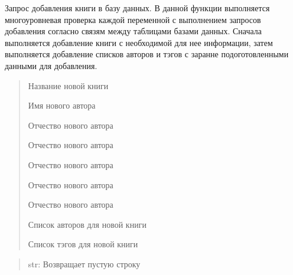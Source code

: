 \documentclass[letterpaper,10pt,russian]{sphinxmanual}
\begin{document}

\begin{fulllineitems}
\label{\detokenize{blueprints:blueprints.add_to_database.add_file}}
\pysigstartsignatures
{}
\pysigstopsignatures
\sphinxAtStartPar
Запрос добавления книги в базу данных.
В данной функции выполняется многоуровневая проверка каждой переменной с выполнением
запросов добавления согласно связям между таблицами базами данных.
Сначала выполняется добавление книги с необходимой для нее информации,
затем выполняется добавление списков авторов и тэгов с заранне подоготовленными данными
для добавления.
\begin{description}
\begin{quote}\begin{description}
\sphinxAtStartPar
Название новой книги

\sphinxAtStartPar
Имя нового автора

\sphinxAtStartPar
Отчество нового автора

\sphinxAtStartPar
Отчество нового автора

\sphinxAtStartPar
Отчество нового автора

\sphinxAtStartPar
Отчество нового автора

\sphinxAtStartPar
Отчество нового автора

\sphinxAtStartPar
Список авторов для новой книги

\sphinxAtStartPar
Список тэгов для новой книги

\end{description}\end{quote}

\end{description}
\begin{quote}\begin{description}
\sphinxAtStartPar
str: Возвращает пустую строку

\end{description}\end{quote}

\end{fulllineitems}
\end{document}
